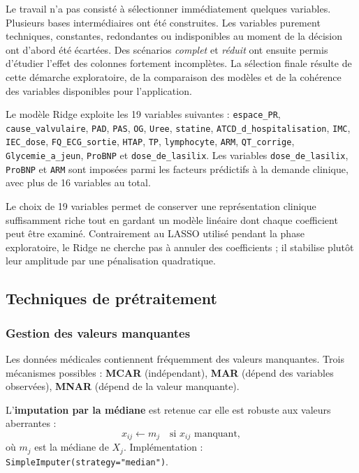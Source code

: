 \documentclass[12pt,a4paper]{report}
\begin{document}
Le travail n'a pas consisté à sélectionner immédiatement quelques variables. Plusieurs
bases intermédiaires ont été construites. Les variables purement techniques, constantes,
redondantes ou indisponibles au moment de la décision ont d'abord été écartées. Des scénarios
\emph{complet} et \emph{réduit} ont ensuite permis d'étudier l'effet des colonnes fortement
incomplètes. La sélection finale résulte de cette démarche exploratoire, de la comparaison
des modèles et de la cohérence des variables disponibles pour l'application.

Le modèle Ridge exploite les 19 variables suivantes : \texttt{espace\_PR},
\texttt{cause\_valvulaire}, \texttt{PAD}, \texttt{PAS}, \texttt{OG}, \texttt{Uree}, \texttt{statine}, \texttt{ATCD\_d\_hospitalisation}, \texttt{IMC}, \texttt{IEC\_dose}, \texttt{FQ\_ECG\_sortie}, \texttt{HTAP}, \texttt{TP}, \texttt{lymphocyte}, \texttt{ARM}, \texttt{QT\_corrige}, \texttt{Glycemie\_a\_jeun}, \texttt{ProBNP} et \texttt{dose\_de\_lasilix}. Les variables \texttt{dose\_de\_lasilix}, \texttt{ProBNP} et \texttt{ARM} sont imposées parmi les facteurs prédictifs à la demande clinique, avec plus de 16 variables au total.

Le choix de 19 variables permet de conserver une représentation clinique suffisamment riche
tout en gardant un modèle linéaire dont chaque coefficient peut être examiné. Contrairement
au LASSO utilisé pendant la phase exploratoire, le Ridge ne cherche pas à annuler des
coefficients ; il stabilise plutôt leur amplitude par une pénalisation quadratique.

\subsection{Techniques de prétraitement}

\subsubsection{Gestion des valeurs manquantes}

Les données médicales contiennent fréquemment des valeurs manquantes. Trois mécanismes
possibles : \textbf{MCAR} (indépendant), \textbf{MAR} (dépend des variables observées),
\textbf{MNAR} (dépend de la valeur manquante).

L'\textbf{imputation par la médiane} est retenue car elle est robuste aux valeurs
aberrantes :
\begin{equation}
 x_{ij} \leftarrow m_j \quad \text{si } x_{ij} \text{ manquant},
\end{equation}
où $m_j$ est la médiane de $X_j$. Implémentation :
\texttt{SimpleImputer(strategy="median")}.
\end{document}
